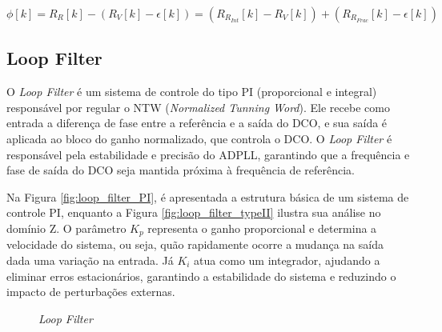  \begin{equation}
	\phi [k]= R_R[k] - ( R_V[k] - \epsilon[k]) =  (R_{R_{Int}}[k] - R_V[k]) + ( R_{R_{Frac}}[k] - \epsilon[k])
	\label{eq:phase_detector}
\end{equation}
\subsection{Loop Filter}

O \textit{Loop Filter} é um sistema de controle do tipo PI (proporcional e integral) responsável por regular o NTW (\textit{Normalized Tunning Word}). Ele recebe como entrada a diferença de fase entre a referência e a saída do DCO, e sua saída é aplicada ao bloco do ganho normalizado, que controla o DCO. O \textit{Loop Filter} é responsável pela estabilidade e precisão do ADPLL, garantindo que a frequência e fase de saída do DCO seja mantida próxima à frequência de referência.

Na Figura \ref{fig:loop_filter_PI}, é apresentada a estrutura básica de um sistema de controle PI, enquanto a Figura \ref{fig:loop_filter_typeII} ilustra sua análise no domínio Z. O parâmetro $K_p$ representa o ganho proporcional e determina a velocidade do sistema, ou seja, quão rapidamente ocorre a mudança na saída dada uma variação na entrada. Já $K_i$ atua como um integrador, ajudando a eliminar erros estacionários, garantindo a estabilidade do sistema e reduzindo o impacto de perturbações externas.

\begin{figure}[h!]
	\caption{\textit{Loop Filter} }
	\begin{center}
	\hfil
	\end{center}
	\label{fig:loop_filter_structure}
\end{figure}

